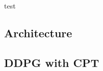test

\subsection{Architecture}\label{subsec:architecture}

\subsection{DDPG with CPT}\label{subsec:ddpg-with-cpt}
